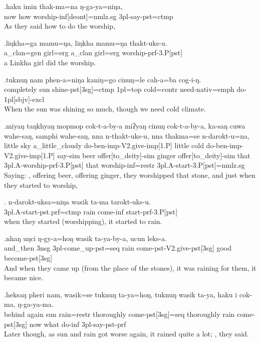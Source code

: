 \exg.haku imin thak-ma=na   ŋ-ga-ya=niŋa,\\
now  how  worship{\sc -inf[deont]=nmlz.sg} {\sc 3pl-}say{\sc -pst=ctmp}\\
As they said how to do the worship,

\exg.liŋkha=ga  mamu=ŋa,  liŋkha mamu=ŋa thakt-uks-u.\\
a\_clan{\sc =gen} girl{\sc =erg} a\_clan girl{\sc =erg} worship{\sc -prf-3.P[pst]}\\
a Linkha girl did the worship.

\exg.tuknuŋ  nam phen-a=niŋa   kaniŋ=go cinuŋ=le  cah-a=ba  cog-i-ŋ.\\
completely sun shine{\sc -pst[3sg]=ctmp} {\sc 1pl=top} cold{\sc =contr} need{\sc -nativ=emph} do{\sc -1pl[sbjv]-excl}\\
When the sun was shining so much, though we need cold climate.

\exg.miyaŋ taŋkhyaŋ mopmop  cok-t-a-by-a miʔyaŋ cinuŋ cok-t-a-by-a,    ka-saŋ cuwa wahe-saŋ,    samphi wahe-saŋ, nna  n-thakt-uks-u,  nna  thakma=se  n-darokt-u=na, \\
little sky  a\_little\_cloudy do{\sc -ben-imp-V2.give-imp[1.P]} little cold do{\sc -ben-imp-V2.give-imp[1.P]} say{\sc -sim} beer offer[to\_deity]{\sc -sim} ginger offer[to\_deity]{\sc -sim} that {\sc 3pl.A-}worship{\sc -prf-3.P[pst]} that worship{\sc -inf=restr} {\sc 3pl.A-}start{\sc -3.P[pst]=nmlz.sg}\\
Saying: , offering beer, offering ginger, they worshipped that stone, and just when they started to worship,

\exg.  n-darokt-uksa=niŋa wasik ta-ma  tarokt-uks-u.\\
{\sc 3pl.A-}start{\sc -pst.prf=ctmp} rain  come{\sc -inf} start{\sc -prf-3.P[pst]}\\
when they started (worshipping), it started to rain.


\exg.nhaŋ  uŋci ŋ-gy-a=hoŋ   wasik ta-ya-by-a,   ucun leks-a.\\
and\_then {\sc 3nsg} {\sc 3pl-}come\_up{\sc -pst=seq}  rain  come{\sc -pst-V2.give-pst[3sg]} good become{\sc -pst[3sg]}\\
And when they came up (from the place of the stones), it was raining for them, it became nice.

\exg.heksaŋ pheri nam, wasik=se  tuknuŋ  ta-ya=hoŋ, tuknuŋ  wasik ta-ya,  haku i  cok-ma,  ŋ-ga-ya-ma.\\
behind  again sun  rain{\sc =restr} thoroughly come{\sc -pst[3sg]=seq} thoroughly rain  come{\sc -pst[3sg]} now  what do{\sc -inf} {\sc 3pl-}say{\sc -pst-prf}\\
Later though, as sun and rain got worse again, it rained quite a lot; , they said.


